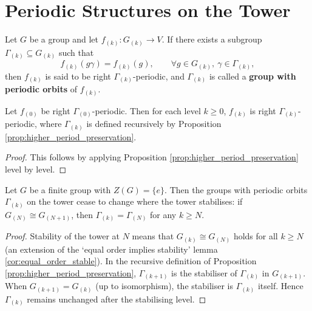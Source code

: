 \section{Periodic Structures on the Tower}

\begin{definition}\label{def:higher_period}
Let $G$ be a group and let $f_{(k)}: G_{(k)}\to V$. If there exists a subgroup $\Gamma_{(k)}\subseteq G_{(k)}$ such that
\[
f_{(k)}(g\gamma) = f_{(k)}(g),\qquad \forall g\in G_{(k)},\ \gamma\in\Gamma_{(k)},
\]
then $f_{(k)}$ is said to be right $\Gamma_{(k)}$-periodic, and $\Gamma_{(k)}$ is called a \textbf{group with periodic orbits} of $f_{(k)}$.
\end{definition}

\begin{proposition}\label{prop:higher_period_transfer}
Let $f_{(0)}$ be right $\Gamma_{(0)}$-periodic. Then for each level $k\ge 0$, $f_{(k)}$ is right $\Gamma_{(k)}$-periodic, where $\Gamma_{(k)}$ is defined recursively by Proposition \ref{prop:higher_period_preservation}.
\end{proposition}

\begin{proof}
This follows by applying Proposition \ref{prop:higher_period_preservation} level by level.
\end{proof}

\begin{proposition}\label{prop:higher_period_stabilization}
Let $G$ be a finite group with $Z(G)=\{e\}$. Then the groups with periodic orbits $\Gamma_{(k)}$ on the tower cease to change where the tower stabilises: if $G_{(N)}\cong G_{(N+1)}$, then $\Gamma_{(k)}=\Gamma_{(N)}$ for any $k\ge N$.
\end{proposition}

\begin{proof}
Stability of the tower at $N$ means that $G_{(k)}\cong G_{(N)}$ holds for all $k\ge N$ (an extension of the `equal order implies stability' lemma \ref{cor:equal_order_stable}). In the recursive definition of Proposition \ref{prop:higher_period_preservation}, $\Gamma_{(k+1)}$ is the stabiliser of $\Gamma_{(k)}$ in $G_{(k+1)}$. When $G_{(k+1)}=G_{(k)}$ (up to isomorphism), the stabiliser is $\Gamma_{(k)}$ itself. Hence $\Gamma_{(k)}$ remains unchanged after the stabilising level.
\end{proof}

